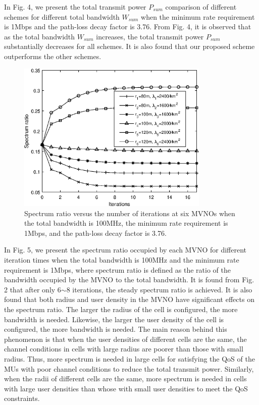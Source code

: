 \documentclass[journal]{IEEEtran}
\begin{document}
In Fig. 4, we present the total transmit power $P_{sum}$ comparison of different schemes for different total bandwidth $W_{sum}$ when the minimum rate requirement is 1Mbps and the path-loss decay factor is 3.76. From Fig. 4, it is observed that as the total bandwidth $W_{sum}$ increases, the total transmit power $P_{sum}$ substantially decreases for all schemes. It is also found that our proposed scheme outperforms the other schemes.

\begin{figure}
	\centering
	\includegraphics[width=3.6in]{SR_convergence.eps}
	\caption{Spectrum ratio versus the number of iterations at six MVNOs when the total bandwidth is 100MHz, the minimum rate requirement is 1Mbps, and the path-loss decay factor is 3.76.}
\end{figure}

In Fig. 5, we present the spectrum ratio occupied by each MVNO for different iteration times when the total bandwidth is 100MHz and the minimum rate requirement is 1Mbps, where spectrum ratio is defined as the ratio of the bandwidth occupied by the MVNO to the total bandwidth.  It is found from Fig. 2 that after only 6$\sim$8 iterations, the steady spectrum ratio is achieved. It is also found that both radius and user density in the MVNO have significant effects on the spectrum ratio. The larger the radius of the cell is configured, the more bandwidth is needed. Likewise, the larger the user density of the cell is configured, the more bandwidth is needed. The main reason behind this phenomenon is that when the user densities of different cells are the same, the channel conditions in cells with large radius are poorer than those with small radius. Thus, more spectrum is needed in large cells for satisfying the QoS of the MUs with poor channel conditions to reduce the total transmit power. Similarly, when the radii of different cells are the same, more spectrum is needed in cells with large user densities than whose with small user densities to meet the QoS constraints.
\end{document}
